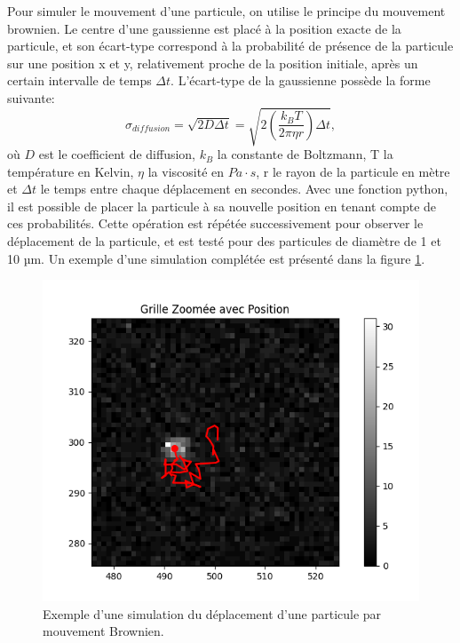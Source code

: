 \documentclass[conference]{IEEEtran}
\begin{document}
Pour simuler le mouvement d'une particule, on utilise le principe du mouvement brownien.
Le centre d'une gaussienne est placé à la position exacte de la particule, et son écart-type correspond à la probabilité de présence de la particule sur une position x et y, 
relativement proche de la position initiale, après un certain intervalle de temps $\Delta t$. L'écart-type de la gaussienne possède la forme suivante:
\begin{equation}
  \sigma_{diffusion} = \sqrt{2D\Delta t} = \sqrt{2\left ( \frac{k_{B}T}{2\pi \eta r} \right )\Delta t},
\end{equation}
où $D$ est le coefficient de diffusion, $k_{B}$ la constante de Boltzmann, T la température en Kelvin, $\eta$ la viscosité en $Pa\cdot s$, r le rayon de la particule en mètre et $\Delta t$ le temps entre chaque déplacement en secondes. 
Avec une fonction python, il est possible de placer la particule à sa nouvelle position en tenant compte de ces probabilités. Cette opération est répétée successivement pour observer 
le déplacement de la particule, et est testé pour des particules de diamètre de 1 et 10 µm. Un exemple d'une simulation complétée est présenté dans la figure \ref{simu}.
\begin{figure}
  \centering
  \includegraphics[scale=0.5]{Blob-lamb=405nm-Mtheo=60-NA=0,85-Taille=1um.png}
  \caption{Exemple d'une simulation du déplacement d'une particule par mouvement Brownien.}
  \label{simu}
\end{figure}
\end{document}
